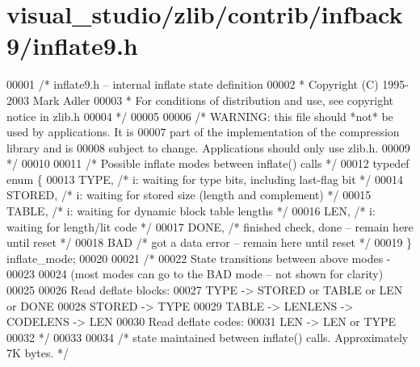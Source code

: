 \hypertarget{visual__studio_2zlib_2contrib_2infback9_2inflate9_8h_source}{}\section{visual\+\_\+studio/zlib/contrib/infback9/inflate9.h}
\label{visual__studio_2zlib_2contrib_2infback9_2inflate9_8h_source}

\begin{DoxyCode}
00001 \textcolor{comment}{/* inflate9.h -- internal inflate state definition}
00002 \textcolor{comment}{ * Copyright (C) 1995-2003 Mark Adler}
00003 \textcolor{comment}{ * For conditions of distribution and use, see copyright notice in zlib.h}
00004 \textcolor{comment}{ */}
00005 
00006 \textcolor{comment}{/* WARNING: this file should *not* be used by applications. It is}
00007 \textcolor{comment}{   part of the implementation of the compression library and is}
00008 \textcolor{comment}{   subject to change. Applications should only use zlib.h.}
00009 \textcolor{comment}{ */}
00010 
00011 \textcolor{comment}{/* Possible inflate modes between inflate() calls */}
00012 \textcolor{keyword}{typedef} \textcolor{keyword}{enum} \{
00013         TYPE,       \textcolor{comment}{/* i: waiting for type bits, including last-flag bit */}
00014         STORED,     \textcolor{comment}{/* i: waiting for stored size (length and complement) */}
00015         TABLE,      \textcolor{comment}{/* i: waiting for dynamic block table lengths */}
00016             LEN,        \textcolor{comment}{/* i: waiting for length/lit code */}
00017     DONE,       \textcolor{comment}{/* finished check, done -- remain here until reset */}
00018     BAD         \textcolor{comment}{/* got a data error -- remain here until reset */}
00019 \} inflate\_mode;
00020 
00021 \textcolor{comment}{/*}
00022 \textcolor{comment}{    State transitions between above modes -}
00023 \textcolor{comment}{}
00024 \textcolor{comment}{    (most modes can go to the BAD mode -- not shown for clarity)}
00025 \textcolor{comment}{}
00026 \textcolor{comment}{    Read deflate blocks:}
00027 \textcolor{comment}{            TYPE -> STORED or TABLE or LEN or DONE}
00028 \textcolor{comment}{            STORED -> TYPE}
00029 \textcolor{comment}{            TABLE -> LENLENS -> CODELENS -> LEN}
00030 \textcolor{comment}{    Read deflate codes:}
00031 \textcolor{comment}{                LEN -> LEN or TYPE}
00032 \textcolor{comment}{ */}
00033 
00034 \textcolor{comment}{/* state maintained between inflate() calls.  Approximately 7K bytes. */}

\end{DoxyCode}
